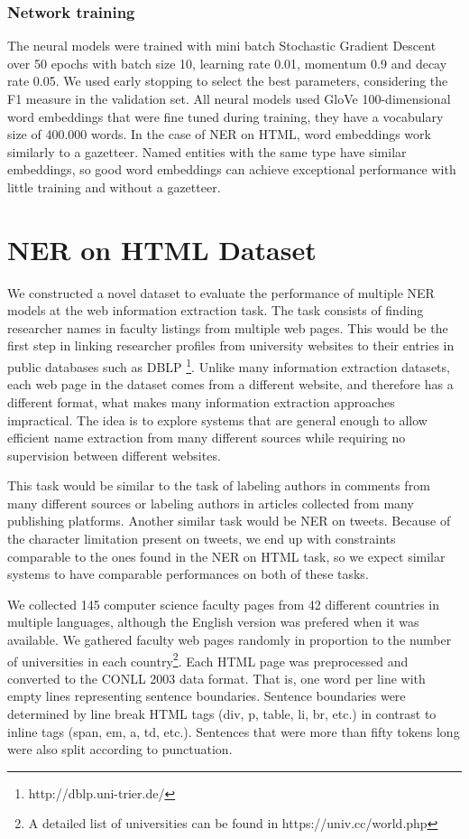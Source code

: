 \documentclass{nle}
\begin{document}
\subsubsection{Network training}

The neural models were trained with mini batch Stochastic Gradient Descent over 50 epochs with batch size 10,
learning rate 0.01, momentum 0.9 and decay rate 0.05. We used early stopping \cite{Caruana2000} to select the best 
parameters, considering the F1 measure in the validation set. All neural models used 
GloVe 100-dimensional word embeddings \cite{Pennington2014} that were fine tuned during training,
they have a vocabulary size of 400.000 words.
In the case of NER on HTML, word embeddings work similarly to a gazetteer. Named entities 
with the same type have similar embeddings, so good word embeddings can achieve exceptional 
performance with little training and without a gazetteer. 

\section{NER on HTML Dataset}
\label{sec:ner_dataset}

We constructed a novel dataset to evaluate the performance of multiple NER models
at the web information extraction task. The task consists of finding researcher
names in faculty listings from multiple web pages. This would be the 
first step in linking researcher profiles from university websites to their entries
in public databases such as DBLP \footnote{http://dblp.uni-trier.de/}. Unlike many
information extraction datasets, each web page in the dataset comes from a different 
website, and therefore has a different format, what makes many information
extraction approaches impractical. The idea is to explore systems that are general 
enough to allow efficient name extraction from many different sources while requiring
no supervision between different websites. 

This task would be similar to the task of labeling authors in comments
from many different sources or labeling authors in articles collected from many
publishing platforms. Another similar task would be NER on tweets. Because of the character
limitation present on tweets, we end up with constraints comparable to the ones
found in the NER on HTML task, so we expect similar systems to have comparable performances
on both of these tasks.

We collected 145 computer science faculty pages from 42 different countries in
multiple languages, although the English version was prefered when it was available.
We gathered faculty web pages randomly in proportion to
the number of universities in each country\footnote{A detailed list of universities can
be found in https://univ.cc/world.php}. Each HTML page was preprocessed and converted
to the CONLL 2003 data format. That is, one word per line with empty lines representing
sentence boundaries. Sentence boundaries were determined by line break HTML tags
(div, p, table, li, br, etc.) in contrast to inline tags (span, em, a, td, etc.). 
Sentences that were more than fifty tokens long were also split according to punctuation.
\end{document}
